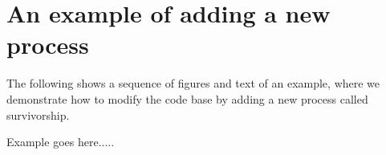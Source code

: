 \section{An example of adding a new process\label{sec:example}}

The following shows a sequence of figures and text of an example, where we demonstrate how to modify the code base by adding a new process called survivorship.

Example goes here.....